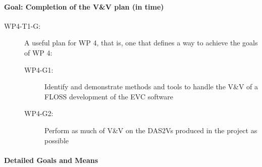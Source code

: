 \paragraph{Goal: Completion of the V\&V plan (in time)}
\label{sec:goal:-completion-vv}

\begin{description}
\item[WP4-T1-G:] A useful plan for WP 4, that is, one that defines a
way to achieve the goals of WP 4:
  \begin{description}
  \item[WP4-G1:] Identify and demonstrate methods and tools to handle
    the V\&V of a FLOSS development of the EVC software
  \item[WP4-G2:] Perform as much of V\&V on the DAS2Vs produced in the
    project as possible
  \end{description}
\end{description}

\paragraph{Detailed Goals and Means}
\label{sec:detailed-goals-means}

